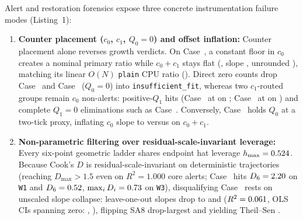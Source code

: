 \documentclass[11pt]{article}
\newcommand{\CaseRef}[1]{Case~#1}
\begin{document}
Alert and restoration forensics expose three concrete instrumentation failure modes (Listing~1):
\begin{enumerate}
\item \textbf{Counter placement ($c_0$, $c_1$, $Q_0{=}0$) and offset inflation:} Counter placement alone reverses growth verdicts. On \CaseRef{\BenchPosOneSixFour{}}, a constant floor in $c_0$ creates a nominal \BenchPosOneSixFourRatio{} primary ratio while $c_0+c_1$ stays flat (\BenchPosOneSixFourTotRatio{}, slope \BenchPosOneSixFourTotSlopeTwoDec{}, unrounded \BenchPosOneSixFourTotSlope{}), matching its linear $O(N)$ \texttt{plain} CPU ratio (\BenchPosOneSixFourCpuRatio{}). Direct zero counts drop \CaseRef{\BenchPosOneZeroZero{}} and \CaseRef{\BenchPosOneThreeOne{}} ($Q_0=0$) into \texttt{insufficient\_fit}, whereas two $c_1$-routed groups remain $c_0$ non-alerts: \BenchCOneOnlyCount{} positive-$Q_1$ hits (\CaseRef{\BenchPosFourSeven{}} at \BenchPosFourSevenCOneRatio{} on \BenchPosFourSevenCOneStream{}; \CaseRef{\BenchPosEleven{}} at \BenchPosElevenCOneRatio{} on \BenchPosElevenCOneStream{}) and \BenchQOneZeroCount{} complete $Q_1=0$ eliminations such as \CaseRef{\BenchPosOneSevenFour{}}. Conversely, \CaseRef{\BenchPosThirteen{}} holds $Q_0$ at a two-tick proxy, inflating $c_0$ slope to \BenchPosThirteenCZeroSlope{} versus \BenchPosThirteenTotSlope{} on $c_0+c_1$.
\item \textbf{Non-parametric filtering over residual-scale-invariant leverage:} Every six-point geometric ladder shares endpoint hat leverage $h_{\max} = 0.524{}$. Because Cook's $D$ is residual-scale-invariant on deterministic trajectories (reaching $D_{\max} > 1.5$ even on $R^2 = 1.000$ core alerts; \CaseRef{\BenchPosThree{}} hits $D_6 = 2.20{}$ on \texttt{W1} and $D_6 = 0.52{}$, $\max_i D_i = 0.73{}$ on \texttt{W3}), disqualifying \CaseRef{\BenchPosThree{}} rests on unscaled slope collapse: leave-one-out slopes drop to \BenchPosThreeSOneLOO{} and \BenchPosThreeSThreeLOO{} ($R^2 = 0.061{}$, OLS CIs spanning zero: \BenchPosThreeSOneCI{}, \BenchPosThreeSThreeCI{}), flipping SA8 drop-largest and yielding Theil--Sen \BenchPosThreeWorstTS{}.

\end{enumerate}
\end{document}
